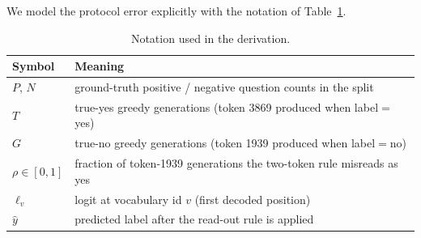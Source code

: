 \documentclass{article}
\begin{document}
We model the protocol error explicitly with the notation of
Table~\ref{tab:notation}.

\begin{table}[h]
\caption{Notation used in the derivation.}
\label{tab:notation}
\centering
\small
\begin{tabular}{ll}
\toprule
Symbol & Meaning \\
\midrule
$P,\,N$           & ground-truth positive / negative question counts in the split \\
$T$               & true-yes greedy generations (token 3869 produced when label$=$yes) \\
$G$               & true-no  greedy generations (token 1939 produced when label$=$no) \\
$\rho\in[0,1]$    & fraction of token-1939 generations the two-token rule misreads as yes \\
$\ell_v$          & logit at vocabulary id $v$ (first decoded position) \\
$\hat{y}$         & predicted label after the read-out rule is applied \\
\bottomrule
\end{tabular}
\end{table}
\end{document}
